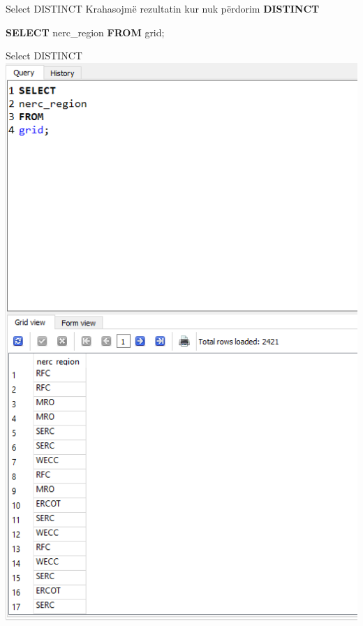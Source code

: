 \documentclass[
  ignorenonframetext,
]{beamer}
\newenvironment{Shaded}{\begin{snugshade}}{\end{snugshade}}
\newcommand{\KeywordTok}[1]{\textcolor[rgb]{0.13,0.29,0.53}{\textbf{#1}}}
\newcommand{\NormalTok}[1]{#1}
\begin{document}
\begin{frame}[fragile]{Select DISTINCT}
\label{select-distinct-1}
Krahasojmë rezultatin kur nuk përdorim \textbf{DISTINCT}


\begin{Shaded}
\begin{Highlighting}[]
\KeywordTok{SELECT} 
\NormalTok{nerc\_region}
\KeywordTok{FROM} 
\NormalTok{grid;}
\end{Highlighting}
\end{Shaded}
\end{frame}

\begin{frame}{Select DISTINCT}
\label{select-distinct-2}
\includegraphics{./Figs/sql18.png}
\end{frame}
\end{document}
